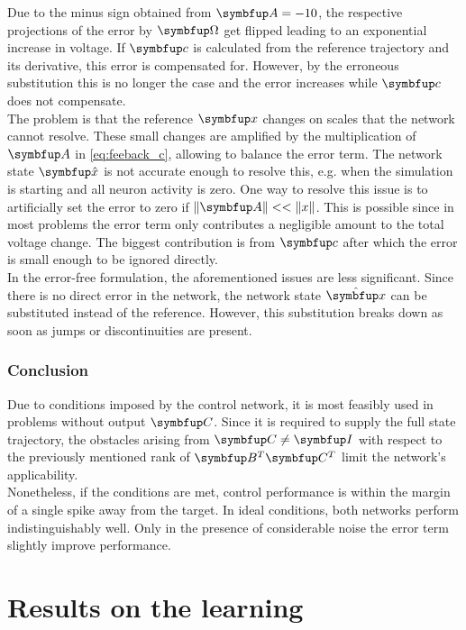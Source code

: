 Due to the minus sign obtained from $\bmu{A} = -10$, the respective projections of the error by $\bmu{\Omega}$ get flipped leading to an exponential increase in voltage. If $\bmu{c}$ is calculated from the reference trajectory and its derivative, this error is compensated for. However, by the erroneous substitution this is no longer the case and the error increases while $\bmu{c}$ does not compensate.\\
The problem is that the reference $\bmu{x}$ changes on scales that the network cannot resolve. These small changes are amplified by the multiplication of $\bmu{A}$ in \cref{eq:feeback_c}, allowing to balance the error term. The network state $\bmu{\hat{x}}$ is not accurate enough to resolve this, e.g. when the simulation is starting and all neuron activity is zero.
One way to resolve this issue is to artificially set the error to zero if $\|\bmu{A}\|<<\|x\|$. This is possible since in most problems the error term only contributes a negligible amount to the total voltage change. The biggest contribution is from $\bmu{c}$ after which the error is small enough to be ignored directly.\\
In the error-free formulation, the aforementioned issues are less significant. Since there is no direct error in the network, the network state $\hat{\bmu{x}}$ can be substituted instead of the reference. However, this substitution breaks down as soon as jumps or discontinuities are present.\\

\subsubsection{Conclusion}

Due to conditions imposed by the control network, it is most feasibly used in problems without output $\bmu{C}$. Since it is required to supply the full state trajectory, the obstacles arising from $\bmu{C} \neq \bmu{I}$ with respect to the previously mentioned rank of $\bmu{B}^T\bmu{C}^T$ limit the network's applicability.\\
Nonetheless, if the conditions are met, control performance is within the margin of a single spike away from the target.
In ideal conditions, both networks perform indistinguishably well. Only in the presence of considerable noise the error term slightly improve performance.

\section{Results on the learning}\label{sec:res_combined_learning}

